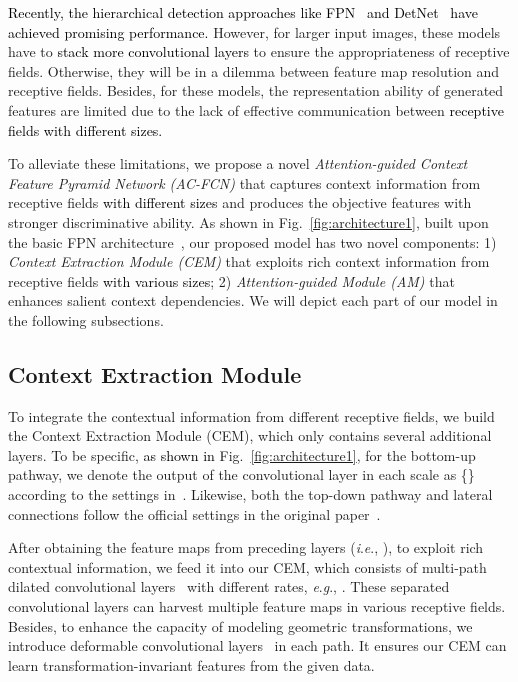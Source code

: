 \documentclass[journal]{IEEEtran}
\newcommand{\ie}{\textit{i}.\textit{e}.\xspace}
\newcommand{\eg}{\textit{e}.\textit{g}.\xspace}
\def\myblue{\textcolor{black}}
\begin{document}
	


\myblue{Recently, the hierarchical detection approaches like FPN~\cite{lin2017feature} and DetNet~\cite{li2018detnet} have achieved promising performance.}
	However, for larger input images, these models have to 
\myblue{stack more convolutional layers}
	to ensure the appropriateness of receptive fields. Otherwise, they will be in a dilemma between feature map resolution and receptive fields.
	Besides, for these models, the representation ability of generated features are limited due to the lack of effective communication between \myblue{receptive fields with different sizes.}


	To alleviate these limitations, we propose a novel \textit{Attention-guided Context Feature Pyramid Network (AC-FCN)} that captures context information from  receptive fields \myblue{with different sizes} and produces the objective features with stronger discriminative ability. As shown in Fig.~\ref{fig:architecture1}, built upon the basic FPN architecture~\cite{lin2017feature}, our proposed model has two novel components: 1) \textit{Context Extraction Module (CEM)} that 
	exploits rich context information from receptive fields \myblue{with various sizes};
2) \textit{Attention-guided Module (AM)} that enhances salient context dependencies.
We will depict each part of our model in the following subsections.
	
	\subsection{Context Extraction Module}
	
	To integrate the contextual information from different receptive fields, we build the Context Extraction Module (CEM), which only contains several additional layers.
To be specific, \myblue{as shown in} Fig.~\ref{fig:architecture1}, for the bottom-up pathway, we denote the output of the convolutional layer in each scale as \{\} according to the settings in~\cite{lin2017feature}. Likewise, both the top-down pathway and lateral connections follow the official settings in the original paper~\cite{lin2017feature}.
	
	After obtaining the feature maps from preceding layers (\ie, ), to exploit rich contextual information, we feed it into our CEM, which consists of multi-path dilated convolutional layers~\cite{yu2015multi} with different rates, \eg, .
These separated convolutional layers can harvest multiple feature maps in various receptive fields.
	Besides, to enhance the capacity of modeling geometric transformations, we introduce deformable convolutional layers~\cite{dai2017deformable} in each path. It ensures our CEM can learn transformation-invariant features from the given data.
\end{document}
